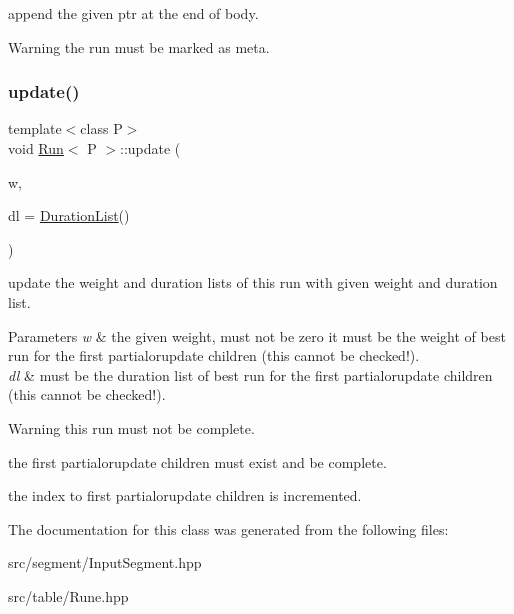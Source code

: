 append the given ptr at the end of body. 

\begin{DoxyWarning}{Warning}
the run must be marked as meta. 
\end{DoxyWarning}
\mbox{\label{classRun_afe9adec90106c1a7433b626aca320367}} 
\subsubsection{\texorpdfstring{update()}{update()}}
{\footnotesize\ttfamily template$<$class P$>$ \\
void \mbox{\hyperlink{classRun}{Run}}$<$ P $>$\+::update (\begin{DoxyParamCaption}\item[{const \mbox{\hyperlink{classWeight}{Weight}} \&}]{w,  }\item[{const \mbox{\hyperlink{classDurationList}{Duration\+List}} \&}]{dl = {\ttfamily \mbox{\hyperlink{classDurationList}{Duration\+List}}()} }\end{DoxyParamCaption})}



update the weight and duration lists of this run with given weight and duration list. 


\begin{DoxyParams}{Parameters}
{\em w} & the given weight, must not be zero it must be the weight of best run for the first partialorupdate children (this cannot be checked!). \\
\hline
{\em dl} & must be the duration list of best run for the first partialorupdate children (this cannot be checked!). \\
\hline
\end{DoxyParams}
\begin{DoxyWarning}{Warning}
this run must not be complete. 

the first partialorupdate children must exist and be complete.
\end{DoxyWarning}
the index to first partialorupdate children is incremented. 

The documentation for this class was generated from the following files\+:\begin{DoxyCompactItemize}
\item 
src/segment/Input\+Segment.\+hpp\item 
src/table/Rune.\+hpp\end{DoxyCompactItemize}
